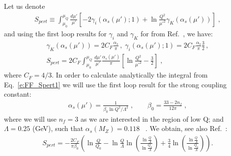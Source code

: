 \documentclass[final,3p,times,onecolumn,sort&compress,hidelinks]{elsarticle}
\newcommand\3[1]{\boldsymbol{#1}}
\begin{document}
Let us denote
\begin{eqnarray}
S_{pert} \equiv \int_{\mu_0}^{\mu_Q} \frac{d \mu'}{\mu'}\left[
-2 \gamma_i(\alpha_s(\mu');1) +\ln\frac{Q^2}{\mu'^2}\gamma_K(\alpha_s(\mu'))
 \right] \; ,
 \label{e:FF_Spert}
\end{eqnarray}
and using the first loop results for $\gamma_i$ and $\gamma_K$ for from Ref.~\cite{Aybat:2011zv}, we have:
\begin{eqnarray}
\gamma_K(\alpha_s(\mu')) = 2 C_F \frac{\alpha_s}{\pi} \, ,  \;
\gamma_i(\alpha_s(\mu');1) = 2 C_F \frac{\alpha_s}{\pi} \frac{3}{2} \, ,\\
S_{pert} = 2 C_F \int_{\mu_0}^{\mu_Q} \frac{d \mu'}{\mu'} \frac{\alpha_s(\mu')}{\pi} \left[\ln\frac{Q^2}{\mu'^2} - \frac{3}{2}
 \right] \; ,
 \label{e:FF_Spert1}
\end{eqnarray}
where $C_F = 4/3$. In order to calculate analytically the integral from Eq.~\eqref{e:FF_Spert1} we will use the first loop result for the strong coupling constant:
\begin{eqnarray}
\alpha_s(\mu') = \frac{1}{\beta_0 \ln Q^2/\Lambda^2} \; , \quad\quad
\beta_0 = \frac{33-2 n_f}{12 \pi}\; ,
 \label{e:as}
\end{eqnarray}
where we will use $n_f=3$ as we are interested in the region of low Q; and $\Lambda = 0.25$ (GeV), such that $\alpha_s(M_Z)= 0.118$ ~\cite{Bethke:2012jm}. We obtain, see also Ref.~\cite{Aidala:2014hva}:
\begin{eqnarray}
S_{pert} = -\frac{2 C_F}{\pi \beta_0}\left ( \ln \frac{Q}{Q_0} - \ln \frac{Q}{\Lambda} \ln \left(\frac{\ln \frac{Q}{\Lambda}}{\ln \frac{Q_0}{\Lambda}} \right)+
\frac{3}{4} \ln \left(\frac{\ln \frac{Q}{\Lambda}}{\ln \frac{Q_0}{\Lambda}} \right)\right).
 \label{e:FF_Spert_analytical}
\end{eqnarray}
\end{document}

